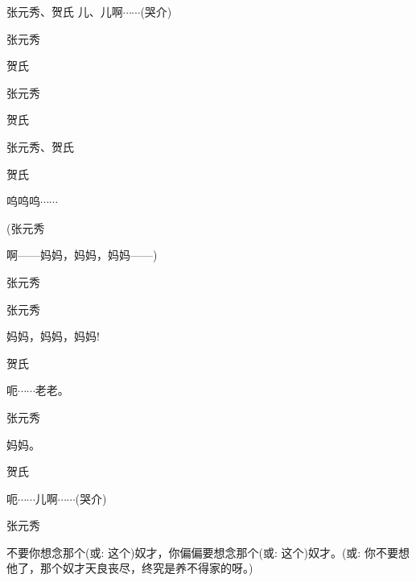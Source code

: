 张元秀、贺氏 儿、儿啊$\cdots{}\cdots{}$(哭介)

张元秀\hspace{20pt}~


贺氏\hspace{30pt}~


张元秀\hspace{20pt}~


贺氏\hspace{30pt}~


张元秀、贺氏


贺氏\hspace{30pt}~

呜呜呜$\cdots{}\cdots{}$

(张元秀\hspace{20pt}~

啊------妈妈，妈妈，妈妈------)

张元秀\hspace{20pt}~


张元秀\hspace{20pt}~

妈妈，妈妈，妈妈!

贺氏\hspace{30pt}~

呃$\cdots{}\cdots{}$老老。

张元秀\hspace{20pt}~

妈妈。

贺氏\hspace{30pt}~

呃$\cdots{}\cdots{}$儿啊$\cdots{}\cdots{}$(哭介)

张元秀

不要你想念那个({\akai 或}: 这个)奴才，你偏偏要想念那个({\akai 或}: 这个)奴才。({\akai 或}: 你不要想他了，那个奴才天良丧尽，终究是养不得家的呀。)

